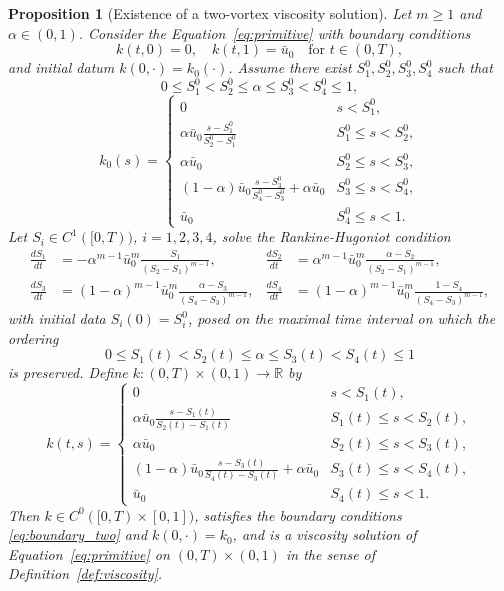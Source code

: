 \documentclass[11pt]{article}
\newtheorem{prop}[thm]{Proposition}
\numberwithin{equation}{section} %
\newcommand{\al}{\alpha}
\begin{document}
\begin{prop}[Existence of a two-vortex viscosity solution]\label{prop:twovortex}
Let $m\ge 1$ and $\alpha \in (0,1)$. Consider the Equation~\eqref{eq:primitive}
with boundary conditions
\begin{equation}\label{eq:boundary_two}
  k(t,0)=0,\quad k(t,1)=\bar u_0 \quad\text{for } t\in(0,T),
\end{equation}
and initial datum $k(0,\cdot)=k_0(\cdot)$. Assume there exist $S_1^0,S_2^0,S_3^0,S_4^0$ such that
\begin{equation}\label{eq:ordering-two}
  0\le S_1^0<S_2^0\le \alpha \le S_3^0<S_4^0\le 1,
\end{equation}
\begin{equation*}
    k_0(s) = \begin{cases}
        0 & s<S_1^0, \\
       \displaystyle \al \bar u_0 \frac{s-S_1^0}{S_2^0-S_1^0} & S_1^0\le s<S_2^0, \\
        \al \bar u_0 & S_2^0\le s < S_3^0,\\
      \displaystyle  ( 1- \al) \bar u_0\frac{ s-S_3^0}{S_4^0-S_3^0} +\al\bar u_0 & S_3^0\le s < S_4^0, \\
        \bar u_0 & S_4^0\le s < 1.
    \end{cases}
\end{equation*}
Let $S_i\in C^1 ([0,T) )$, $i=1,2,3,4$, solve the Rankine-Hugoniot condition
\begin{align*}
  \frac{dS_1}{dt} &= -\alpha^{m-1}\bar u_0^{ m} \frac{S_1}{ (S_2-S_1 )^{m-1}}, 
  & \frac{dS_2}{dt} &= \alpha^{m-1}\bar u_0^{ m} \frac{\alpha-S_2}{ (S_2-S_1 )^{m-1}},\\
  \frac{dS_3}{dt} &= (1-\alpha)^{m-1}\bar u_0^{ m} \frac{\alpha-S_3}{ (S_4-S_3 )^{m-1}}, 
  & \frac{dS_4}{dt} &= (1-\alpha)^{m-1}\bar u_0^{ m} \frac{1-S_4}{ (S_4-S_3 )^{m-1}},
\end{align*}
with initial data $S_i(0)=S_i^0$, posed on the maximal time interval on which the ordering
\begin{equation}\label{eq:ordering-two-evol}
  0\le S_1(t)<S_2(t)\le \alpha \le S_3(t)<S_4(t)\le 1
\end{equation}
is preserved.
Define $k:(0,T)\times(0,1)\to\mathbb{R}$ by
\begin{equation}\label{def:twovortex}
    k(t,s) = \begin{cases}
        0 & s<S_1(t), \\
       \displaystyle \al \bar u_0 \frac{s-S_1(t)}{S_2(t)-S_1(t)} & S_1(t)\le s<S_2(t), \\
        \al \bar u_0 & S_2(t)\le s < S_3(t),\\
      \displaystyle  ( 1- \al) \bar u_0\frac{ s-S_3(t)}{S_4(t)-S_3(t)} +\al\bar u_0 & S_3(t)\le s < S_4(t), \\
        \bar u_0 & S_4(t)\le s < 1.
    \end{cases}
\end{equation}
Then $k\in C^0 ([0,T)\times[0,1] )$, satisfies the boundary conditions \eqref{eq:boundary_two} and $k(0,\cdot)=k_0$, and is a viscosity solution of Equation~\eqref{eq:primitive} on $(0,T)\times(0,1)$ in the sense of Definition~\ref{def:viscosity}.
\end{prop}
\end{document}

